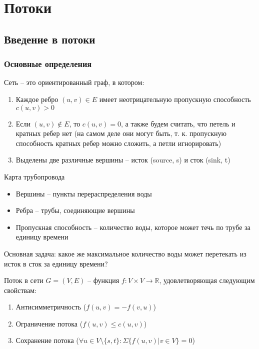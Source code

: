 \section{Потоки}

\subsection{Введение в потоки}

\subsubsection{Основные определения}

\begin{definition}
    Сеть -- это ориентированный граф, в котором:
    \begin{enumerate}
        \item Каждое ребро $(u, v) \in E$ имеет неотрицательную пропускную способность $c(u,v) > 0$
        \item Если $(u,v) \notin E$, то $c(u, v) = 0$, а также будем считать, что петель и кратных ребер нет (на самом деле они могут быть, т. к. пропускную способность кратных ребер можно сложить, а петли игнорировать)
        \item Выделены две различные вершины -- исток (source, s) и сток (sink, t)
    \end{enumerate}
\end{definition}

\begin{example}
    Карта трубопровода
    \begin{itemize}
        \item Вершины -- пункты перераспределения воды
        \item Ребра -- трубы, соединяющие вершины
        \item Пропускная способность -- количество воды, которое может течь по трубе за единицу времени
    \end{itemize}
\end{example} 

\noindent Основная задача: какое же максимальное количество воды может перетекать из исток в сток за единицу времени?

\begin{definition}
    Поток в сети $G = (V, E)$ -- функция $f: V \times V \rightarrow \mathbb{R}$, удовлетворяющая следующим свойствам:
    \begin{enumerate}
        \item Антисимметричность ($f(u, v) = -f(v, u)$)
        \item Ограничение потока ($f(u, v) \leq c(u, v)$)
        \item Сохранение потока ($\forall u \in V \setminus \{s, t\}: \Sigma \{f(u, v) | v \in V\} = 0$)
    \end{enumerate}
\end{definition}

